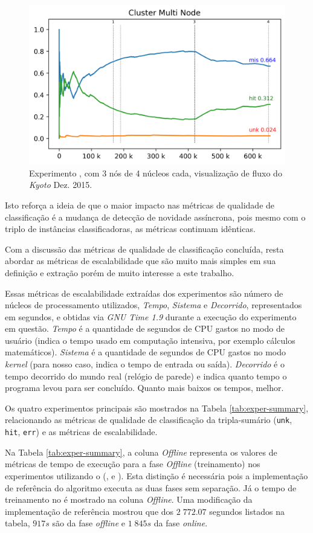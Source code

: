 \begin{figure}[htb]
  \centering
  \includegraphics[width=0.75\linewidth]{experiments/tmi-n12-log.png}
  \caption{Experimento \expD, \mfog com 3 nós de 4 núcleos cada, visualização de fluxo do \dataset \emph{Kyoto} Dez. 2015.}
  \label{fig:multi-flow}
\end{figure}

Isto reforça a ideia de que o maior impacto nas métricas de qualidade de
classificação é a mudança de detecção de novidade assíncrona, pois mesmo com o
triplo de instâncias classificadoras, as métricas continuam idênticas.

Com a discussão das métricas de qualidade de classificação concluída, resta
abordar as métricas de escalabilidade que são muito mais simples em sua
definição e extração porém de muito interesse a este trabalho.

Essas métricas de escalabilidade extraídas dos experimentos são número de núcleos de processamento
utilizados, \emph{Tempo}, \emph{Sistema} e \emph{Decorrido}, representados em
segundos, e obtidas via \emph{GNU Time 1.9} durante a execução do experimento
em questão.
\emph{Tempo} é a quantidade de segundos de CPU gastos no modo de usuário
(indica o tempo usado em computação intensiva, por exemplo cálculos matemáticos).
\emph{Sistema} é a quantidade de segundos de CPU gastos no modo \emph{kernel} (para
nosso caso, indica o tempo de entrada ou saída).
\emph{Decorrido} é o tempo decorrido do mundo real (relógio de parede) e indica
quanto tempo o programa levou para ser concluído.
Quanto mais baixos os tempos, melhor.

Os quatro experimentos principais são mostrados na Tabela
\ref{tab:exper-summary}, relacionando as métricas de qualidade de classificação
da tripla-sumário (\texttt{unk}, \texttt{hit}, \texttt{err}) e as métricas de
escalabilidade.

Na Tabela \ref{tab:exper-summary}, a coluna \emph{Offline} representa os valores
de métricas de tempo de execução para a fase \emph{Offline} (treinamento) nos
experimentos utilizando o \mfog (\expB, \expC e \expD).
Esta distinção é necessária pois a implementação de referência do algoritmo
\minas executa as duas fases sem separação. Já o tempo de treinamento no \mfog é
mostrado na coluna \emph{Offline}.
Uma modificação da implementação de referência mostrou que dos $2\;772.07$
segundos listados na tabela, $917s$ são da fase \emph{offline} e $1\;845s$ da
fase \emph{online}.

